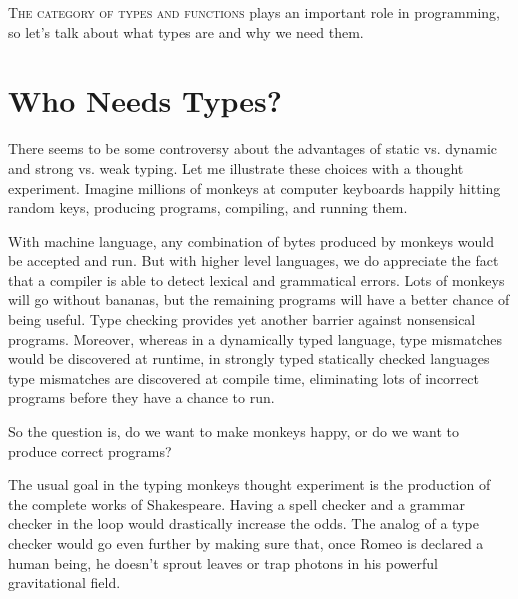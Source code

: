 \lettrine[lhang=0.17]{T}{he category of types and functions} plays an important role in
programming, so let's talk about what types are and why we need them.

\section{Who Needs Types?}\label{who-needs-types}

There seems to be some controversy about the advantages of static vs.
dynamic and strong vs. weak typing. Let me illustrate these choices with
a thought experiment. Imagine millions of monkeys at computer keyboards
happily hitting random keys, producing programs, compiling, and running
them.

\begin{figure}
\centering
{}
\end{figure}

With machine language, any combination of bytes produced by monkeys
would be accepted and run. But with higher level languages, we do
appreciate the fact that a compiler is able to detect lexical and
grammatical errors. Lots of monkeys will go without bananas, but the
remaining programs will have a better chance of being useful. Type
checking provides yet another barrier against nonsensical programs.
Moreover, whereas in a dynamically typed language, type mismatches would
be discovered at runtime, in strongly typed statically checked languages
type mismatches are discovered at compile time, eliminating lots of
incorrect programs before they have a chance to run.

So the question is, do we want to make monkeys happy, or do we want to
produce correct programs?

The usual goal in the typing monkeys thought experiment is the
production of the complete works of Shakespeare. Having a spell checker
and a grammar checker in the loop would drastically increase the odds.
The analog of a type checker would go even further by making sure that,
once Romeo is declared a human being, he doesn't sprout leaves or trap
photons in his powerful gravitational field.

